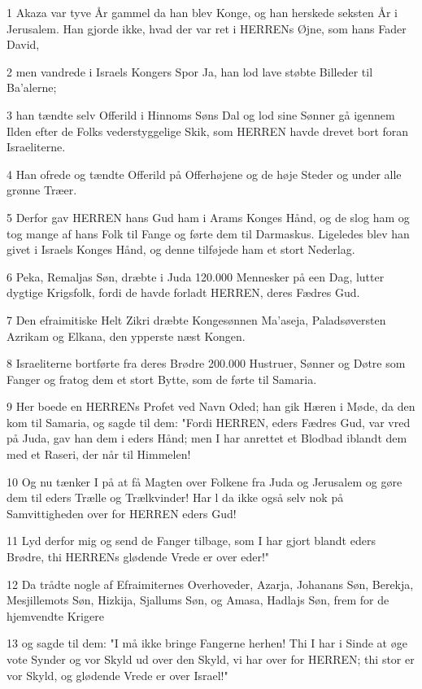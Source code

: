 \par 1 Akaza var tyve År gammel da han blev Konge, og han herskede seksten År i Jerusalem. Han gjorde ikke, hvad der var ret i HERRENs Øjne, som hans Fader David,
\par 2 men vandrede i Israels Kongers Spor Ja, han lod lave støbte Billeder til Ba'alerne;
\par 3 han tændte selv Offerild i Hinnoms Søns Dal og lod sine Sønner gå igennem Ilden efter de Folks vederstyggelige Skik, som HERREN havde drevet bort foran Israeliterne.
\par 4 Han ofrede og tændte Offerild på Offerhøjene og de høje Steder og under alle grønne Træer.
\par 5 Derfor gav HERREN hans Gud ham i Arams Konges Hånd, og de slog ham og tog mange af hans Folk til Fange og førte dem til Darmaskus. Ligeledes blev han givet i Israels Konges Hånd, og denne tilføjede ham et stort Nederlag.
\par 6 Peka, Remaljas Søn, dræbte i Juda 120.000 Mennesker på een Dag, lutter dygtige Krigsfolk, fordi de havde forladt HERREN, deres Fædres Gud.
\par 7 Den efraimitiske Helt Zikri dræbte Kongesønnen Ma'aseja, Paladsøversten Azrikam og Elkana, den ypperste næst Kongen.
\par 8 Israeliterne bortførte fra deres Brødre 200.000 Hustruer, Sønner og Døtre som Fanger og fratog dem et stort Bytte, som de førte til Samaria.
\par 9 Her boede en HERRENs Profet ved Navn Oded; han gik Hæren i Møde, da den kom til Samaria, og sagde til dem: "Fordi HERREN, eders Fædres Gud, var vred på Juda, gav han dem i eders Hånd; men I har anrettet et Blodbad iblandt dem med et Raseri, der når til Himmelen!
\par 10 Og nu tænker I på at få Magten over Folkene fra Juda og Jerusalem og gøre dem til eders Trælle og Trælkvinder! Har l da ikke også selv nok på Samvittigheden over for HERREN eders Gud!
\par 11 Lyd derfor mig og send de Fanger tilbage, som I har gjort blandt eders Brødre, thi HERRENs glødende Vrede er over eder!"
\par 12 Da trådte nogle af Efraimiternes Overhoveder, Azarja, Johanans Søn, Berekja, Mesjillemots Søn, Hizkija, Sjallums Søn, og Amasa, Hadlajs Søn, frem for de hjemvendte Krigere
\par 13 og sagde til dem: "I må ikke bringe Fangerne herhen! Thi I har i Sinde at øge vote Synder og vor Skyld ud over den Skyld, vi har over for HERREN; thi stor er vor Skyld, og glødende Vrede er over Israel!"
